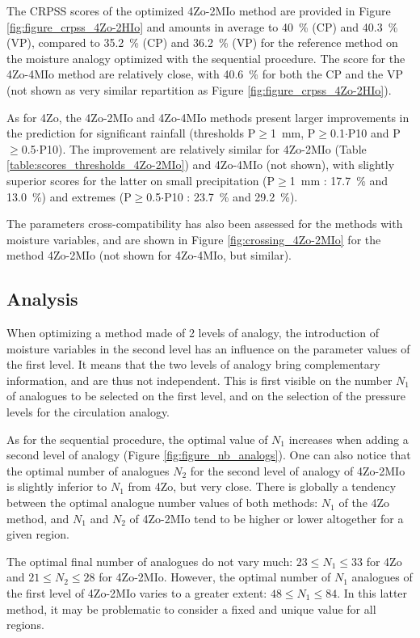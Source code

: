\documentclass[review]{elsarticle}
\begin{document}
The CRPSS scores of the optimized 4Zo-2MIo method are provided in Figure \ref{fig:figure_crpss_4Zo-2HIo} and amounts in average to 40~\% (CP) and 40.3~\% (VP), compared to 35.2~\% (CP) and 36.2~\% (VP) for the reference method on the moisture analogy optimized with the sequential procedure. The score for the 4Zo-4MIo method are relatively close, with 40.6~\% for both the CP and the VP (not shown as very similar repartition as Figure \ref{fig:figure_crpss_4Zo-2HIo}).

As for 4Zo, the 4Zo-2MIo and 4Zo-4MIo methods present larger improvements in the prediction for significant rainfall (thresholds P\(\geq\)1~mm, P\(\geq\)0.1\(\cdot\)P10 and P\(\geq\)0.5\(\cdot\)P10). The improvement are relatively similar for 4Zo-2MIo (Table \ref{table:scores_thresholds_4Zo-2MIo}) and 4Zo-4MIo (not shown), with slightly superior scores for the latter on small precipitation (P\(\geq\)1~mm : 17.7~\% and 13.0~\%) and extremes (P\(\geq\)0.5\(\cdot\)P10 : 23.7~\% and 29.2~\%).

The parameters cross-compatibility has also been assessed for the methods with moisture variables, and are shown in Figure \ref{fig:crossing_4Zo-2MIo} for the method 4Zo-2MIo (not shown for 4Zo-4MIo, but similar).


\subsection{Analysis}

When optimizing a method made of 2 levels of analogy, the introduction of moisture variables in the second level has an influence on the parameter values of the first level. It means that the two levels of analogy bring complementary information, and are thus not independent. This is first visible on the number $N_{1}$ of analogues to be selected on the first level, and on the selection of the pressure levels for the circulation analogy. 

As for the sequential procedure, the optimal value of $N_{1}$ increases when adding a second level of analogy (Figure \ref{fig:figure_nb_analogs}). One can also notice that the optimal number of analogues $N_{2}$ for the second level of analogy of 4Zo-2MIo is slightly inferior to $N_{1}$ from 4Zo, but very close. There is globally a tendency between the optimal analogue number values of both methods: $N_{1}$ of the 4Zo method, and $N_{1}$ and $N_{2}$ of 4Zo-2MIo tend to be higher or lower altogether for a given region.

The optimal final number of analogues do not vary much: $23 \leq N_{1} \leq 33$ for 4Zo and $21 \leq N_{2} \leq 28$ for 4Zo-2MIo. However, the optimal number of $N_{1}$ analogues of the first level of 4Zo-2MIo varies to a greater extent: $48 \leq N_{1} \leq 84$. In this latter method, it may be problematic to consider a fixed and unique value for all regions.
\end{document}

